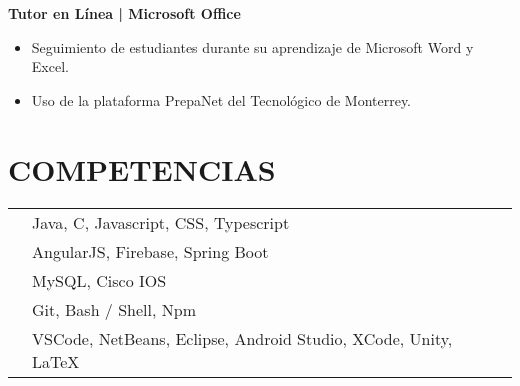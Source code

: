 \documentclass{res}
\begin{document}
\begin{resume}
    \textbf{Tutor en Línea | Microsoft Office} 
    \begin{itemize}
        \item Seguimiento de estudiantes durante su aprendizaje de Microsoft Word y Excel.
        \item Uso de la plataforma PrepaNet del Tecnológico de Monterrey.
    \end{itemize}

    \longjump

    \section{\large{COMPETENCIAS}} 
    \begin{tabularx}{15cm}{SB}
         &
        Java, C, Javascript, CSS, Typescript
        \\
         &
        AngularJS, Firebase, Spring Boot
        \\
         &
        MySQL, Cisco IOS
        \\
         &
        Git, Bash / Shell, Npm
        \\
         &
        VSCode, NetBeans, Eclipse, Android Studio, XCode, Unity, LaTeX
    \end{tabularx}
\end{resume}
\end{document}
